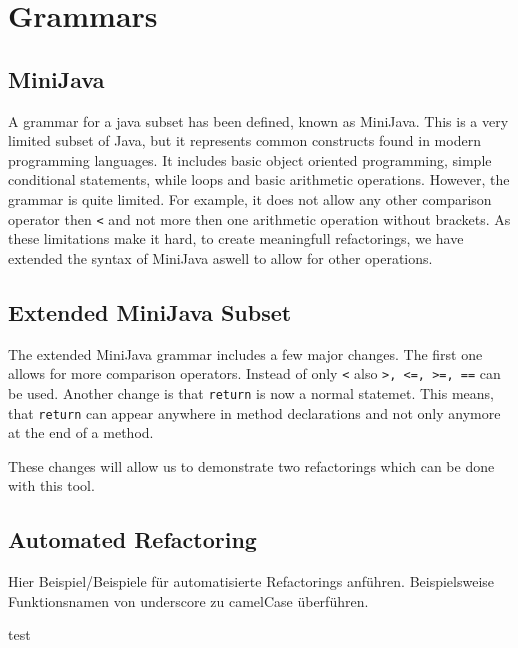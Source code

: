 
\section{Grammars}

\subsection{MiniJava}

A grammar for a java subset has been defined, known as MiniJava. This is a very limited subset of Java, but it represents common constructs found in modern programming languages.
It includes basic object oriented programming, simple conditional statements, while loops and basic arithmetic operations. However, the grammar is quite limited. For example, it does not
allow any other comparison operator then \verb|<| and not more then one arithmetic operation without brackets. As these limitations make it hard, to create meaningfull refactorings, we have extended
the syntax of MiniJava aswell to allow for other operations.

\subsection{Extended MiniJava Subset}

The extended MiniJava grammar includes a few major changes. The first one allows for more comparison operators. Instead of only \verb|<| also \verb|>, <=, >=, ==| can be used.
Another change is that \verb|return| is now a normal statemet. This means, that \verb|return| can appear anywhere in method declarations and not only anymore at the end of a method.

These changes will allow us to demonstrate two refactorings which can be done with this tool. 


\subsection{Automated Refactoring}

Hier Beispiel/Beispiele für automatisierte Refactorings anführen. Beispielsweise Funktionsnamen von underscore zu camelCase überführen.

test